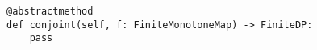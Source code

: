 \begin{verbatim}
@abstractmethod
def conjoint(self, f: FiniteMonotoneMap) -> FiniteDP:
    pass
\end{verbatim}